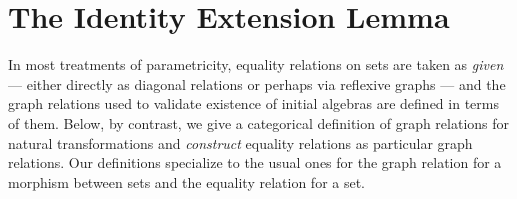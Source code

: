 \documentclass[runningheads]{llncs}
\begin{document}
\begin{comment}
    \rho[\psi := \text{--}][\overline{\beta := \text{--}}])
    (\overline{\setsem{\Gamma;\Phi \vdash \tau[\phi := H]}\rho}) \\
=&\mu(\setsem{\Gamma; \Phi, \psi, \overline{\beta}, \phi \vdash G}
\rho [\phi := \setsem{\Gamma;\Phi,\overline{\alpha}\vdash
    H}\rho[\overline{\alpha := \text{--}}]][\psi := \text{--}]
     [\overline{\beta := \text{--}}]) \\
&\hspace{0.5in} (\overline{\setsem{\Gamma;\Phi,\phi \vdash \tau} \rho
       [\phi := \setsem{\Gamma;\Phi,\overline{\alpha}\vdash H}
         \rho[\overline{\alpha := \text{--}}]]}) \\
=&\setsem{\Gamma;\Phi,\phi\vdash(\mu\psi.\lambda\overline{\beta}.G)
  \overline{\tau}}\rho [\phi :=
  \setsem{\Gamma;\Phi,\overline{\alpha}\vdash H}\rho[\overline{\alpha
      := \text{--}}]] 
\end{array}\]
Here, the first equality is by
Definition~\ref{def:second-order-subst}, the second and fourth are by
Definition~\ref{def:set-sem}, and the third is by the induction
hypothesis and weakening.
\end{itemize}
\end{proof}
\end{comment}

\vspace*{-0.1in}

\section{The Identity Extension Lemma}\label{sec:iel}

\vspace*{-0.1in}

In most treatments of parametricity, equality relations on sets are
taken as {\em given} --- either directly as diagonal relations or
perhaps via reflexive graphs --- and the graph relations used to
validate existence of initial algebras are defined in terms of
them. Below, by contrast, we give a categorical definition of graph
relations for natural transformations and {\em construct} equality
relations as particular graph relations. Our definitions specialize to
the usual ones for the graph relation for a morphism between sets and
the equality relation for a set.
\end{document}
